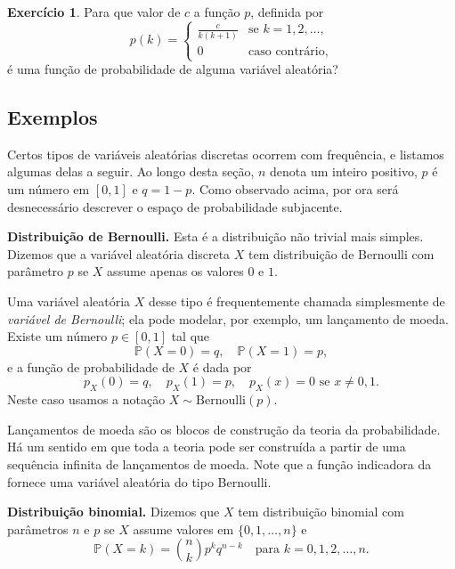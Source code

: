 \documentclass[12pt,portuguese]{article}
\theoremstyle{definition}
\newtheorem{exercise}{Exercício}
\begin{document}
\begin{exercise}\label{exercise:valor-de-c-massa}
  Para que valor de \(c\) a função \(p\), definida por
  \[
    p(k) = \begin{cases} \displaystyle\frac{c}{k(k+1)} & \text{se } k = 1, 2, \dots, \\[0.3cm]
      0 & \text{caso contrário,} \end{cases}
  \]
  é uma função de probabilidade de alguma variável aleatória?
\end{exercise}
\subsection{Exemplos}
\label{sec:exemplos-de-distribuicoes}

Certos tipos de variáveis aleatórias discretas ocorrem com frequência, e
listamos algumas delas a seguir. Ao longo desta seção, \(n\) denota um inteiro
positivo, \(p\) é um número em \([0, 1]\) e \(q = 1 - p\). Como observado
acima, por ora será desnecessário descrever o espaço de probabilidade
subjacente.


\bigskip

\noindent\textbf{Distribuição de Bernoulli.} Esta é a distribuição não trivial
mais simples. Dizemos que a variável aleatória discreta \(X\) tem distribuição
de Bernoulli com parâmetro \(p\) se \(X\) assume apenas os valores \(0\) e
\(1\).

Uma variável aleatória \(X\) desse tipo é frequentemente chamada simplesmente
de \emph{variável de Bernoulli}; ela pode modelar, por exemplo, um lançamento
de moeda. Existe um número \(p \in [0, 1]\) tal que
\begin{equation}\label{eq:bernoulli}
  \mathbb{P}(X = 0) = q, \quad \mathbb{P}(X = 1) = p,
\end{equation}
e a função de probabilidade de \(X\) é dada por
\[
  p_X(0) = q, \quad p_X(1) = p, \quad p_X(x) = 0 \text{ se } x \neq 0, 1.
\]
Neste caso usamos a notação $X\sim \mathrm{Bernoulli}(p)$.

Lançamentos de moeda são os blocos de construção da teoria da probabilidade.
Há um sentido em que toda a teoria pode ser construída a partir de uma
sequência infinita de lançamentos de moeda. Note que a função indicadora
da  fornece uma variável aleatória do tipo Bernoulli.


\bigskip
\noindent\textbf{Distribuição binomial.} Dizemos que \(X\) tem distribuição binomial
com parâmetros \(n\) e \(p\) se \(X\) assume valores em \(\{0, 1, \dots, n\}\)
e
\begin{equation}\label{eq:binomial}
  \mathbb{P}(X = k) = \binom{n}{k} p^k q^{n-k} \quad \text{para }
  k = 0, 1, 2, \dots, n.
\end{equation}
\end{document}
